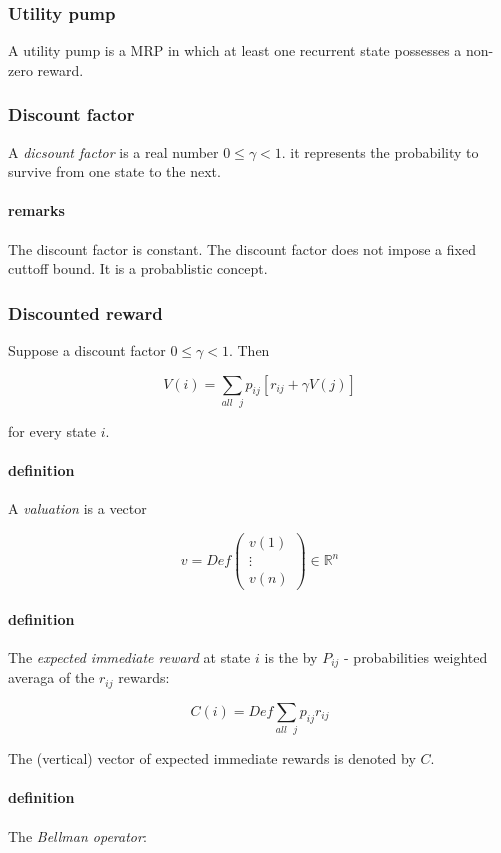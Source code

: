 \documentclass{article}
\begin{document}
\subsubsection{Utility pump}
A utility pump is a MRP in which at least one recurrent state possesses a
non-zero reward.
\subsubsection{Discount factor}
A \emph{dicsount factor} is a real number $0 \le \gamma < 1$. it represents
the probability to survive from one state to the next.

\paragraph{remarks} The discount factor is constant. The discount factor
does not impose a fixed cuttoff bound. It is a probablistic concept.

\subsubsection{Discounted reward}
Suppose a discount factor $0 \le \gamma < 1$. Then

\[V(i)=\sum_{all\mbox{\ }j} p_{ij}[r_{ij} + \gamma V(j)]\]

for every state $i$.

\paragraph{definition} A \emph{valuation} is a vector

\[v=Def
\begin{pmatrix}
	v(1) \\
	\vdots \\
	v(n)
\end{pmatrix}
\in \mathbb{R}^n
\]

\paragraph{definition} The \emph{expected immediate reward} at state $i$ is
the by $P_{ij}$ - probabilities weighted averaga of the $r_{ij}$ rewards:

\[C(i)=Def\sum_{all \mbox{\ }j} p_{ij} r_{ij} \]

The (vertical) vector of expected immediate rewards is denoted by $C$.

\paragraph{definition} The \emph{Bellman operator}:
\end{document}
